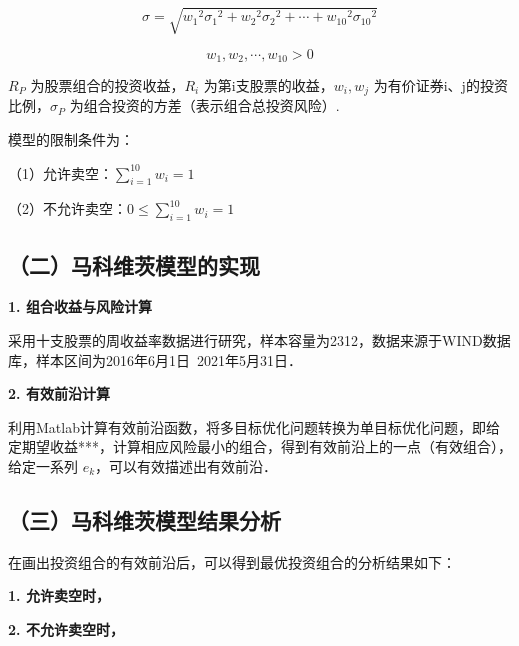 \begin{equation}
\sigma=\sqrt{{w_1}^2 {\sigma_1}^2 + {w_2}^2 {\sigma_2}^2 + \cdots +{w_{10}}^2 {\sigma_{10}}^2}
\end{equation}

\begin{equation}
w_1,w_2,\cdots,w_{10}>0
\end{equation}

$R_P$ 为股票组合的投资收益，$R_i$ 为第i支股票的收益，$w_i,w_j$ 为有价证券i、j的投资比例，$\sigma_P$ 为组合投资的方差（表示组合总投资风险）.

模型的限制条件为：

（1）允许卖空：$\sum_{i=1}^{10} w_i=1$

（2）不允许卖空：$0\leq\sum_{i=1}^{10} w_i=1$

\subsection{（二）马科维茨模型的实现}

\textbf{1. 组合收益与风险计算}

采用十支股票的周收益率数据进行研究，样本容量为2312，数据来源于WIND数据库，样本区间为2016年6月1日~2021年5月31日．

\textbf{2. 有效前沿计算}

利用Matlab计算有效前沿函数，将多目标优化问题转换为单目标优化问题，即给定期望收益***，计算相应风险最小的组合，得到有效前沿上的一点（有效组合），给定一系列 $e_k$，可以有效描述出有效前沿．


\subsection{（三）马科维茨模型结果分析}

在画出投资组合的有效前沿后，可以得到最优投资组合的分析结果如下：

\textbf{1. 允许卖空时，}



\textbf{2. 不允许卖空时，}